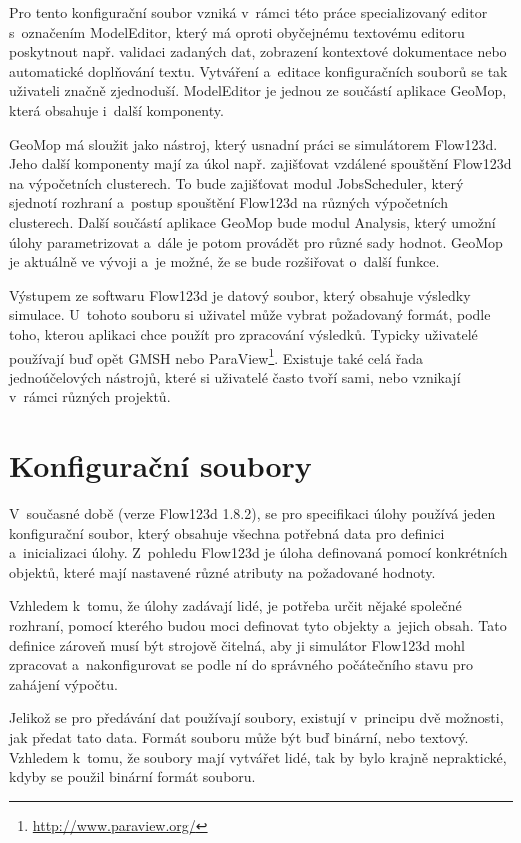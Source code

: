 \documentclass[FM,bw,DP]{tulthesis}
\begin{document}
Pro tento konfigurační soubor vzniká v~rámci této práce specializovaný editor s~označením ModelEditor, který má oproti obyčejnému textovému editoru poskytnout např. validaci zadaných dat, zobrazení kontextové dokumentace nebo automatické doplňování textu. Vytváření a~editace konfiguračních souborů se tak uživateli značně zjednoduší. ModelEditor je jednou ze součástí aplikace GeoMop, která obsahuje i~další komponenty.

GeoMop má sloužit jako nástroj, který usnadní práci se simulátorem Flow123d. Jeho další komponenty mají za úkol např. zajišťovat vzdálené spouštění Flow123d na výpočetních clusterech. To bude zajišťovat modul JobsScheduler, který sjednotí rozhraní a~postup spouštění Flow123d na různých výpočetních clusterech. Další součástí aplikace GeoMop bude modul Analysis, který umožní úlohy parametrizovat a~dále je potom provádět pro různé sady hodnot. GeoMop je aktuálně ve vývoji a~je možné, že se bude rozšiřovat o~další funkce.

Výstupem ze softwaru Flow123d je datový soubor, který obsahuje výsledky simulace. U~tohoto souboru si uživatel může vybrat požadovaný formát, podle toho, kterou aplikaci chce použít pro zpracování výsledků. Typicky uživatelé používají buď opět GMSH nebo ParaView\footnote{\url{http://www.paraview.org/}}. Existuje také celá řada jednoúčelových nástrojů, které si uživatelé často tvoří sami, nebo vznikají v~rámci různých projektů.

\section{Konfigurační soubory}

V~současné době (verze Flow123d 1.8.2), se pro specifikaci úlohy používá jeden konfigurační soubor, který obsahuje všechna potřebná data pro definici a~inicializaci úlohy. Z~pohledu Flow123d je úloha definovaná pomocí konkrétních objektů, které mají nastavené různé atributy na požadované hodnoty. 

Vzhledem k~tomu, že úlohy zadávají lidé, je potřeba určit nějaké společné rozhraní, pomocí kterého budou moci definovat tyto objekty a~jejich obsah. Tato definice zároveň musí být strojově čitelná, aby ji simulátor Flow123d mohl zpracovat a~nakonfigurovat se podle ní do správného počátečního stavu pro zahájení výpočtu.

Jelikož se pro předávání dat používají soubory, existují v~principu dvě možnosti, jak předat tato data. Formát souboru může být buď binární, nebo textový. Vzhledem k~tomu, že soubory mají vytvářet lidé, tak by bylo krajně nepraktické, kdyby se použil binární formát souboru.
\end{document}
